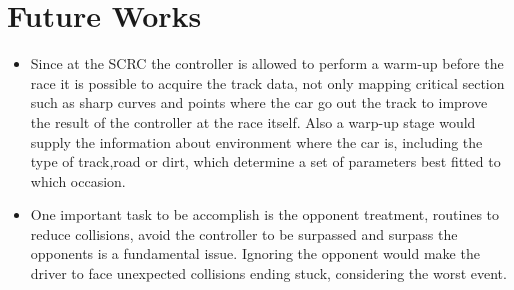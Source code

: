 \section{Future Works} 	
	\begin{itemize}
		 \item Since at the SCRC the controller is allowed to perform a warm-up before the race it is possible to acquire the track data, not only mapping critical section such as sharp curves and points where the car go out the track to improve the result of the controller at the race itself. Also a warp-up stage would supply the information about environment where the car is, including the type of track,road or dirt, which determine a set of parameters best fitted to which occasion. 
        
		\item One important task to be accomplish is the opponent treatment, routines to reduce collisions, avoid the controller to be surpassed and surpass the opponents is a fundamental issue. Ignoring the opponent would make the driver to face unexpected collisions ending stuck, considering the worst event.
	\end{itemize}
	

	
